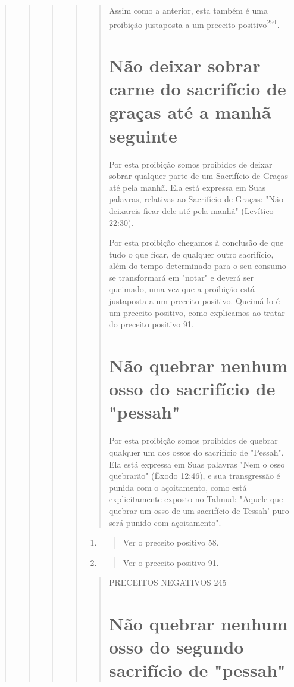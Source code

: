 \begin{quote}
\begin{quote}
\begin{quote}
\begin{quote}
\begin{quote}
Assim como a anterior, esta também é uma proibição justaposta a um
preceito positivo\textsuperscript{291}.

\section{Não deixar sobrar carne do sacrifício de graças até a manhã seguinte}

Por esta proibição somos proibidos de deixar sobrar qualquer parte de um
Sacrifício de Graças até pela manhã. Ela está expressa em Suas palavras,
relativas ao Sacrifício de Graças: "Não deixareis ficar dele até pela
manhã" (Le­vítico 22:30).

Por esta proibição chegamos à conclusão de que tudo o que ficar, de
qualquer outro sacrifício, além do tempo determinado para o seu consumo
se transformará em "notar" e deverá ser queimado, uma vez que a
proibição está justaposta a um preceito positivo. Queimá-lo é um
preceito positivo, co­mo explicamos ao tratar do preceito positivo 91.

\section{Não quebrar nenhum osso do sacrifício de "pessah"}

Por esta proibição somos proibidos de quebrar qualquer um dos os­sos do
sacrifício de "Pessah". Ela está expressa em Suas palavras "Nem o osso
quebrarão" (Êxodo 12:46), e sua transgressão é punida com o açoitamento,
co­mo está explicitamente exposto no Talmud: "Aquele que quebrar um osso
de um sacrifício de Tessah' puro será punido com açoitamento".
\end{quote}

\begin{enumerate}
\def\labelenumi{\arabic{enumi}.}
\setcounter{enumi}{289}
\item
 \begin{quote}
 Ver o preceito positivo 58.
 \end{quote}
\item
 \begin{quote}
 Ver o preceito positivo 91.
 \end{quote}
\end{enumerate}

\begin{quote}
PRECEITOS NEGATIVOS 245

\section{Não quebrar nenhum osso do segundo sacrifício de "pessah"}


\end{quote}
\end{quote}
\end{quote}
\end{quote}
\end{quote}

